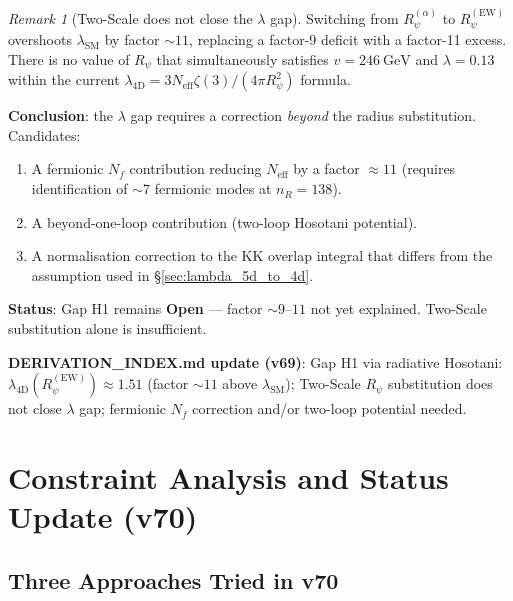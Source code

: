 \documentclass[12pt]{article}
\theoremstyle{definition}
\theoremstyle{remark}
\newtheorem{remark}[theorem]{Remark}
\begin{document}
\begin{remark}[Two-Scale does not close the $\lambda$ gap]
Switching from $R_\psi^{(\alpha)}$ to $R_\psi^{(\text{EW})}$ overshoots
$\lambda_{\text{SM}}$ by factor $\sim 11$, replacing a factor-9 deficit
with a factor-11 excess.  There is no value of $R_\psi$ that simultaneously
satisfies $v = 246\ \text{GeV}$ and $\lambda = 0.13$ within the current
$\lambda_{\text{4D}} = 3N_{\text{eff}}\zeta(3)/(4\pi R_\psi^2)$ formula.

\textbf{Conclusion}: the $\lambda$ gap requires a correction
\emph{beyond} the radius substitution.  Candidates:
\begin{enumerate}
  \item A fermionic $N_f$ contribution reducing $N_{\text{eff}}$
        by a factor $\approx 11$ (requires identification of $\sim 7$
        fermionic modes at $n_R = 138$).
  \item A beyond-one-loop contribution (two-loop Hosotani potential).
  \item A normalisation correction to the KK overlap integral that
        differs from the assumption used in §\ref{sec:lambda_5d_to_4d}.
\end{enumerate}
\textbf{Status}: Gap H1 remains \textbf{Open} — factor $\sim 9$--$11$
not yet explained.  Two-Scale substitution alone is insufficient.
\end{remark}

\textbf{DERIVATION\_INDEX.md update (v69)}: Gap H1 via radiative Hosotani:
$\lambda_{\text{4D}}(R_\psi^{(\text{EW})}) \approx 1.51$ (factor $\sim 11$
above $\lambda_{\text{SM}}$); Two-Scale $R_\psi$ substitution does not
close $\lambda$ gap; fermionic $N_f$ correction and/or two-loop potential
needed.

\section{Constraint Analysis and Status Update (v70)}
\label{sec:constraint_v70}


\subsection{Three Approaches Tried in v70}
\end{document}
